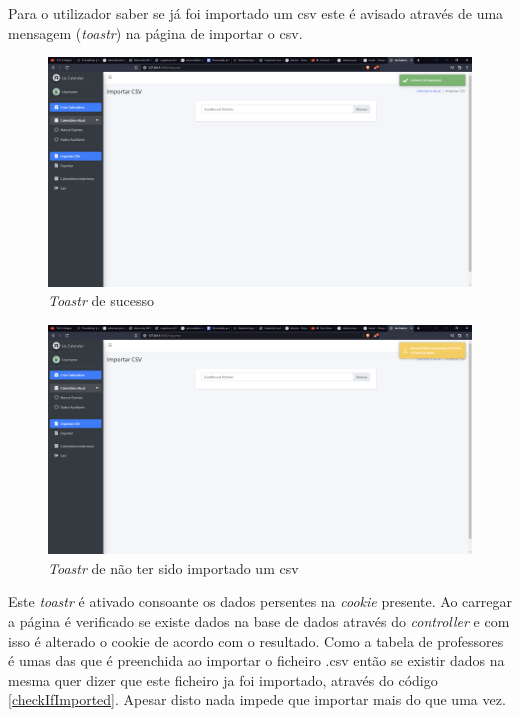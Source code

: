 \documentclass[12pt, twoside]{report}
\begin{document}
	Para o utilizador saber se já foi importado um csv este é avisado através de uma mensagem (\textit{toastr}) na página de importar o csv. 
	
	\begin{figure}[H] 
	\centering
	\includegraphics[width=1\textwidth,height=1\textheight,keepaspectratio]{image/importarCSV}
	\caption{\textit{Toastr} de sucesso}
	\label{importarCSVSucess}
		
	\end{figure}

	\begin{figure}[H] 


	\centering 			\includegraphics[width=1\textwidth,height=1\textheight,keepaspectratio]{image/importCSVFail}
	\caption{\textit{Toastr} de não ter sido importado um csv}
	\label{importarCSVFail}
	
	\end{figure}

	Este \textit{toastr} é ativado consoante os dados persentes na \textit{cookie} presente. Ao carregar a página é verificado se existe dados na base de dados através do \textit{controller} e com isso é alterado o cookie de acordo com o resultado. Como a tabela de professores é umas das que é preenchida ao importar o ficheiro .csv então se existir dados na mesma quer dizer que este ficheiro ja foi importado, através do código \ref{checkIfImported}. Apesar disto nada impede que importar mais do que uma vez.
	
\end{document}
